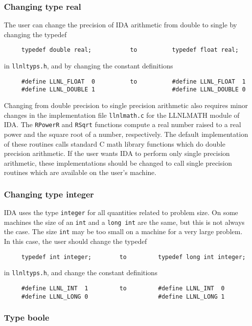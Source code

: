 \documentclass[11pt]{article}
\begin{document}
\subsubsection{Changing type real}

The user can change the precision of IDA arithmetic from double to single
by changing the typedef 
\begin{verbatim}
     typedef double real;           to          typedef float real;
\end{verbatim}
in {\tt llnltyps.h}, and by changing the constant definitions
\begin{verbatim}
     #define LLNL_FLOAT  0          to          #define LLNL_FLOAT  1
     #define LLNL_DOUBLE 1                      #define LLNL_DOUBLE 0
\end{verbatim}

Changing from double precision to single precision arithmetic also
requires minor changes in the implementation file {\tt llnlmath.c} for
the LLNLMATH module of IDA. The {\tt RPowerR} and {\tt RSqrt}
functions compute a real number raised to a real power and the square
root of a number, respectively. The default implementation of these
routines calls standard C math library functions which do double
precision arithmetic.  If the user wants IDA to perform only single
precision arithmetic, these implementations should be changed to call
single precision routines which are available on the user's machine.


\subsubsection{Changing type integer}

IDA uses the type {\tt integer} for all quantities related to problem
size.  On some machines the size of an {\tt int} and a {\tt long int}
are the same, but this is not always the case.  The size {\tt int} may
be too small on a machine for a very large problem.  In this case, the
user should change the typedef
\begin{verbatim} 
     typedef int integer;        to         typedef long int integer;
\end{verbatim}
in {\tt llnltyps.h}, and change the constant definitions  
\begin{verbatim}
     #define LLNL_INT  1         to         #define LLNL_INT  0
     #define LLNL_LONG 0                    #define LLNL_LONG 1
\end{verbatim}


\subsubsection{Type boole}
\end{document}
